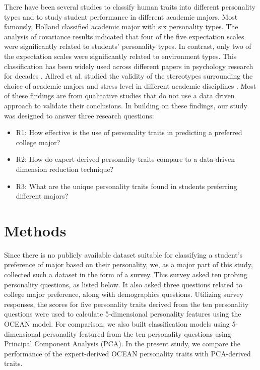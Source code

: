 \documentclass[conference]{IEEEtran}
\begin{document}
There have been several studies to classify human traits into different personality types and to study student performance in different academic majors. Most famously, Holland \cite{schneider1983holland} classified academic major with six personality types. The analysis of covariance results indicated that four of the five expectation scales were significantly related to students’ personality types. In contrast, only two of the expectation scales were significantly related to environment types. This classification has been widely used across different papers in psychology research for decades \cite{Weidman2005}. Allred et al. studied the validity of the stereotypes surrounding the choice of academic majors and stress level in different academic disciplines \cite{allred2013relationship}. Most of these findings are from qualitative studies that do not use a data driven approach to validate their conclusions.
In building on these findings, our study was designed to answer three research questions:
\begin{itemize}
    \item R1: How effective is the use of personality traits in predicting a preferred college major?
    \item R2: How do expert-derived personality traits compare to a data-driven dimension reduction technique?
    \item R3: What are the unique personality traits found in students preferring different majors?
\end{itemize}



\section{Methods}

Since there is no publicly available dataset suitable for classifying a student’s preference of major based on their personality, we, as a major part of this study, collected such a dataset in the form of a survey. This survey asked ten probing personality questions, as listed below. It also asked three questions related to college major preference, along with demographics questions. Utilizing survey responses, the scores for five personality traits derived from the ten personality questions were used to calculate 5-dimensional personality features using the OCEAN model. For comparison, we also built classification models using 5-dimensional personality featured from the ten personality questions using Principal Component Analysis (PCA). In the present study, we compare the performance of the expert-derived OCEAN personality traits with PCA-derived traits.
\end{document}
